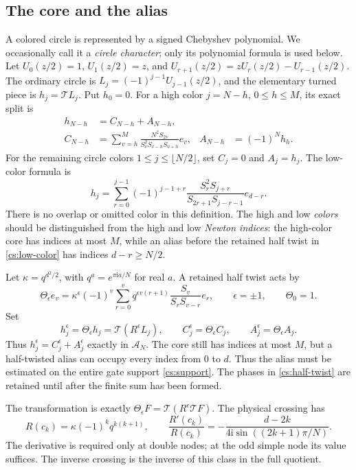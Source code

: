 \documentclass[11pt]{article}
\theoremstyle{remark}\newtheorem{remark}[theorem]{Remark}
\numberwithin{equation}{section}
\newcommand{\ii}{\mathrm i}
\newcommand{\Turn}{\mathcal T}
\begin{document}
\subsection{The core and the alias}
A colored circle is represented by a signed Chebyshev polynomial.
We occasionally call it a \emph{circle character}; only its polynomial
formula is used below. Let $U_0(z/2)=1$, $U_1(z/2)=z$, and $U_{r+1}(z/2)=zU_r(z/2)-U_{r-1}(z/2)$. The ordinary circle is $L_j=(-1)^{j-1}U_{j-1}(z/2)$, and the elementary turned piece is $h_j=\Turn L_j$. Put $h_0=0$. For a high color $j=N-h$, $0\le h\le M$, its exact split is
\begin{align}
 h_{N-h}&=C_{N-h}+A_{N-h},\\
 C_{N-h}&=\sum_{v=h}^{M}
 \frac{N^2S_{2v}}{S_v^2S_{v-h}S_{v+h}}e_v,
 &A_{N-h}&=(-1)^N h_h.\label{cs:split}
\end{align}
For the remaining circle colors $1\le j\le\lfloor N/2\rfloor$, set $C_j=0$ and $A_j=h_j$. The low-color formula is
\begin{equation}\label{cs:low-color}
 h_j=\sum_{r=0}^{j-1}(-1)^{j-1+r}
 \frac{S_r^2S_{j+r}}{S_{2r+1}S_{j-r-1}}e_{d-r}.
\end{equation}
There is no overlap or omitted color in this definition. The high and low \emph{colors} should be distinguished from the high and low \emph{Newton indices}: the high-color core has indices at most $M$, while an alias before the retained half twist in \eqref{cs:low-color} has indices $d-r\ge N/2$.

Let $\kappa=q^{d^2/2}$, with $q^a=e^{\pi\ii a/N}$ for real $a$. A retained half twist acts by
\begin{equation}\label{cs:half-twist}
 \Theta_\epsilon e_v=\kappa^\epsilon(-1)^v
 \sum_{r=0}^v q^{\epsilon v(r+1)}
 \frac{S_v}{S_rS_{v-r}}e_r,\qquad \epsilon=\pm1,
 \qquad \Theta_0=1.
\end{equation}
Set
\[
 h_j^\epsilon=\Theta_\epsilon h_j=\Turn(R^\epsilon L_j),\qquad
 C_j^\epsilon=\Theta_\epsilon C_j,\qquad
 A_j^\epsilon=\Theta_\epsilon A_j.
\]
Thus $h_j^\epsilon=C_j^\epsilon+A_j^\epsilon$ exactly in $\mathscr A_N$. The core still has indices at most $M$, but a half-twisted alias can occupy every index from $0$ to $d$. Thus the alias must be estimated on the entire gate support \eqref{cs:support}. The phases in \eqref{cs:half-twist} are retained until after the finite sum has been formed.

The transformation is exactly
\(\Theta_\epsilon F=\Turn(R^\epsilon\Turn F)\). The physical crossing has
\begin{equation}\label{cs:circle-crossing}
 R(c_k)=\kappa(-1)^kq^{k(k+1)},\qquad
 \frac{R'(c_k)}{R(c_k)}
 =-\frac{d-2k}{4\ii\sin((2k+1)\pi/N)}.
\end{equation}
The derivative is required only at double nodes; at the odd simple
node its value suffices. The inverse crossing is the inverse of this
class in the full quotient.
\end{document}
